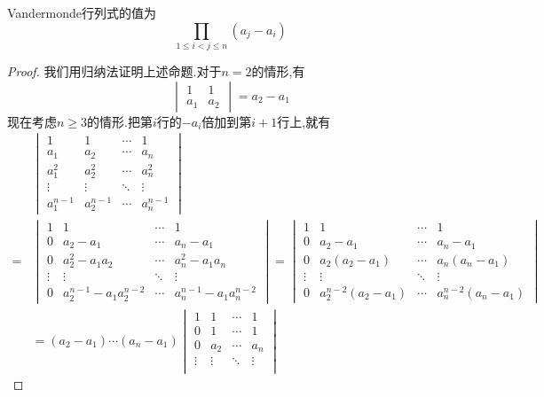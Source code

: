 \documentclass{ctexart}
\begin{document}
\begin{theorem}
    Vandermonde行列式的值为
    \[\prod_{1\leqslant i<j\leqslant n}\left(a_j-a_i\right)\]
\end{theorem}
\begin{proof}
    我们用归纳法证明上述命题.对于$n=2$的情形,有
    \[\begin{vmatrix}
        1&1\\a_1&a_2
    \end{vmatrix}=a_2-a_1\]
    现在考虑$n\geqslant 3$的情形.把第$i$行的$-a_i$倍加到第$i+1$行上,就有
    \[\begin{aligned}
        &\begin{vmatrix}
            1&1&\cdots&1\\
            a_1&a_2&\cdots&a_n\\
            a_1^2&a_2^2&\cdots&a_n^2\\
            \vdots&\vdots&\ddots&\vdots\\
            a_1^{n-1}&a_2^{n-1}&\cdots&a_n^{n-1}
        \end{vmatrix}\\
        =&\begin{vmatrix}
            1&1&\cdots&1\\
            0&a_2-a_1&\cdots&a_n-a_1\\
            0&a_2^2-a_1a_2&\cdots&a_n^2-a_1a_n\\
            \vdots&\vdots&\ddots&\vdots\\
            0&a_2^{n-1}-a_1a_2^{n-2}&\cdots&a_n^{n-1}-a_1a_n^{n-2}
        \end{vmatrix}
        =\begin{vmatrix}
            1&1&\cdots&1\\
            0&a_2-a_1&\cdots&a_n-a_1\\
            0&a_2\left(a_2-a_1\right)&\cdots&a_n\left(a_n-a_1\right)\\
            \vdots&\vdots&\ddots&\vdots\\
            0&a_2^{n-2}\left(a_2-a_1\right)&\cdots&a_n^{n-2}\left(a_n-a_1\right)
        \end{vmatrix} \\
        &= \left(a_2-a_1\right)\cdots\left(a_n-a_1\right)\begin{vmatrix}
            1&1&\cdots&1\\
            0&1&\cdots&1\\
            0&a_2&\cdots&a_n\\
            \vdots&\vdots&\ddots&\vdots\\

\end{vmatrix}
\end{aligned}\]
\end{proof}
\end{document}
